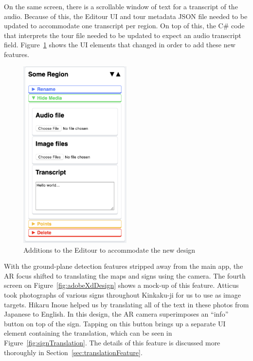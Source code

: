 \documentclass[a4paper, 10pt, american, titlepage]{article}
\begin{document}
On the same screen, there is a scrollable window of text for a transcript of
the audio. Because of this, the Editour UI and tour metadata JSON file needed
to be updated to accommodate one transcript per region. On top of this, the C\#
code that interprets the tour file needed to be updated to expect an audio
transcript field.  Figure~\ref{fig:editourAdditions} shows the UI elements that
changed in order to add these new features.

\begin{figure}[h]
	\centering
	\includegraphics[width=0.5\textwidth]{editour-additions.png}
	\caption{Additions to the Editour to accommodate the new design}
	\label{fig:editourAdditions}
\end{figure}

With the ground-plane detection features stripped away from the main app, the
AR focus shifted to translating the maps and signs using the camera. The fourth
screen on Figure~\ref{fig:adobeXdDesign} shows a mock-up of this feature.
Atticus took photographs of various signs throughout Kinkaku-ji for us to use
as image targets. Hikaru Inoue helped us by translating all of the text in
these photos from Japanese to English. In this design, the AR camera
superimposes an ``info'' button on top of the sign. Tapping on this button
brings up a separate UI element containing the translation, which can be seen
in Figure~\ref{fig:signTranslation}. The details of this feature is discussed
more thoroughly in Section~\ref{sec:translationFeature}.
\end{document}
